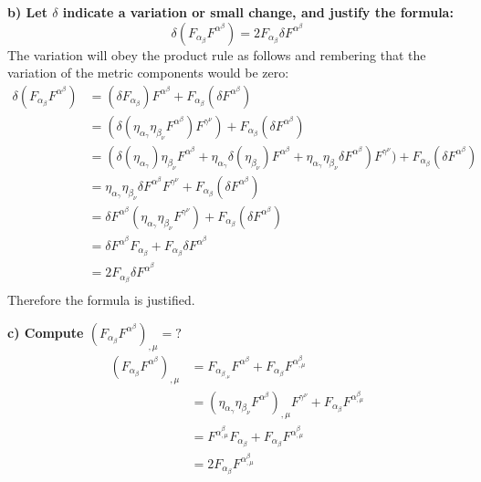 \documentclass[9pt]{report}
\begin{document}
\begin{enumerate}
  \textbf{b) Let $\delta$ indicate a variation or small change, and justify the
  formula:}
  \[
    \delta(F_\alpha_\beta F^\alpha^\beta) = 2 F_\alpha_\beta \delta F^\alpha^\beta
  \]
  The variation  will obey the product rule as follows and rembering that the variation of
  the metric components would be zero:
  \[
    \begin{align}
    \delta(F_\alpha_\beta F^\alpha^\beta) &= (\delta F_\alpha_\beta) F^\alpha^\beta + F_\alpha_\beta (\delta F^\alpha^\beta) \\
                                          &= (\delta (\eta_\alpha_\gamma \eta_\beta_\nu F^\alpha^\beta ) F^\gamma^\nu) + F_\alpha_\beta (\delta F^\alpha^\beta) \\
                                          &= (\delta (\eta_\alpha_\gamma) \eta_\beta_\nu F^\alpha^\beta + \eta_\alpha_\gamma \delta(\eta_\beta_\nu) F^\alpha^\beta + \eta_\alpha_\gamma \eta_\beta_\nu \delta F^\alpha^\beta  ) F^\gamma^\nu) + F_\alpha_\beta (\delta F^\alpha^\beta) \\
                                          &= \eta_\alpha_\gamma \eta_\beta_\nu \delta F^\alpha^\beta  F^\gamma^\nu + F_\alpha_\beta (\delta F^\alpha^\beta) \\
                                          &= \delta F^\alpha^\beta (\eta_\alpha_\gamma \eta_\beta_\nu  F^\gamma^\nu) + F_\alpha_\beta (\delta F^\alpha^\beta) \\
                                          &= \delta F^\alpha^\beta F_\alpha_\beta + F_\alpha_\beta \delta F^\alpha^\beta \\
                                          &= 2 F_\alpha_\beta \delta F^\alpha^\beta \\
  \end{align}
  \]
  Therefore the formula is justified.

  \textbf{c) Compute $(F_\alpha_\beta F^\alpha^\beta)_{,\mu} = ?$}
  \[ 
    \begin{align}
    (F_\alpha_\beta F^\alpha^\beta)_{,\mu} &= F_\alpha_\beta_{,\mu} F^\alpha^\beta + F_\alpha_\beta F^\alpha^\beta_{,\mu} \\
                                           &= (\eta_\alpha_\gamma \eta_\beta_\nu F^\alpha^\beta)_{,\mu} F^\gamma^\nu + F_\alpha_\beta F^\alpha^\beta_{,\mu} \\
                                           &= F^\alpha^\beta_{,\mu} F_\alpha_\beta + F_\alpha_\beta F^\alpha^\beta_{,\mu} \\
                                           &= 2F_\alpha_\beta F^\alpha^\beta_{,\mu} \\
    \end{align}
  \]
\end{enumerate}
\end{document}
